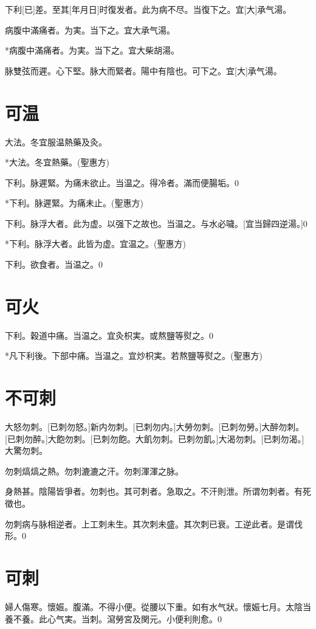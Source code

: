 \documentclass[12pt,oneside,UTF8,b5paper]{ctexbook}她她她她她她她
\begin{document}
下利[已]差。至其[年月日]时復发者。此为病不尽。当復下之。宜[大]承气湯。

病腹中滿痛者。为実。当下之。宜大承气湯。

*病腹中滿痛者。为実。当下之。宜大柴胡湯。

脉雙弦而遲。心下堅。脉大而緊者。陽中有陰也。可下之。宜[大]承气湯。

\chapter{可温}

大法。冬宜服温熱藥及灸。

*大法。冬宜熱藥。(聖惠方)

下利。脉遲緊。为痛未欲止。当温之。得冷者。滿而便腸垢。0

*下利。脉遲緊。为痛未止。(聖惠方)

下利。脉浮大者。此为虚。以强下之故也。当温之。与水必噦。[宜当歸四逆湯。]0

*下利。脉浮大者。此皆为虚。宜温之。(聖惠方)

下利。欲食者。当温之。0

\chapter{可火}

下利。穀道中痛。当温之。宜灸枳実。或熬鹽等熨之。0

*凡下利後。下部中痛。当温之。宜炒枳実。若熬鹽等熨之。(聖惠方)

\chapter{不可刺}

大怒勿刺。[已刺勿怒。]新内勿刺。[已刺勿内。]大勞勿刺。[已刺勿勞。]大醉勿刺。[已刺勿醉。]大飽勿刺。[已刺勿飽。大飢勿刺。已刺勿飢。]大渴勿刺。[已刺勿渴。]大驚勿刺。

勿刺熇熇之熱。勿刺漉漉之汗。勿刺渾渾之脉。

身熱甚。陰陽皆爭者。勿刺也。其可刺者。急取之。不汗則泄。所谓勿刺者。有死徵也。

勿刺病与脉相逆者。上工刺未生。其次刺未盛。其次刺已衰。工逆此者。是谓伐形。0

\chapter{可刺}

婦人傷寒。懷娠。腹滿。不得小便。從腰以下重。如有水气狀。懷娠七月。太陰当養不養。此心气実。当刺。瀉勞宮及関元。小便利則愈。0
\end{document}

